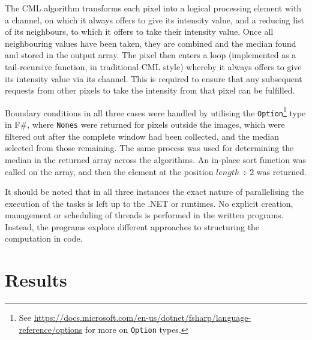 The CML algorithm transforms each pixel into a logical processing element with a channel, on which it always offers to give its intensity value, and a reducing list of its neighbours, to which it offers to take their intensity value.  Once all neighbouring values have been taken, they are combined and the median found and stored in the output array.  The pixel then enters a loop (implemented as a tail-recursive function, in traditional CML style) whereby it always offers to give its intensity value via its channel.  This is required to ensure that any subsequent requests from other pixels to take the intensity from that pixel can be fulfilled.

Boundary conditions in all three cases were handled by utilising the \texttt{Option}\footnote{See \url{https://docs.microsoft.com/en-us/dotnet/fsharp/language-reference/options} for more on \texttt{Option} types.} type in F\#, where \texttt{Nones} were returned for pixels outside the images, which were filtered out after the complete window had been collected, and the median selected from those remaining.  The same process was used for determining the median in the returned array across the algorithms.  An in-place sort function was called on the array, and then the element at the position $length \div 2$ was returned.

It should be noted that in all three instances the exact nature of parallelising the execution of the tasks is left up to the .NET or \hopac{} runtimes.  No explicit creation, management or scheduling of threads is performed in the written programs.  Instead, the programs explore different approaches to structuring the computation in code.

\section{Results}


